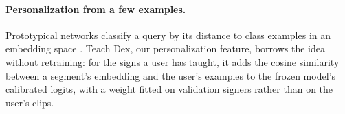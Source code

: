 \paragraph{Personalization from a few examples.}
Prototypical networks classify a query by its distance to class examples in an embedding space
\citep{snell2017prototypical}. Teach Dex, our personalization feature, borrows the idea without
retraining: for the signs a user has taught, it adds the cosine similarity between a segment's
embedding and the user's examples to the frozen model's calibrated logits, with a weight fitted on
validation signers rather than on the user's clips.
